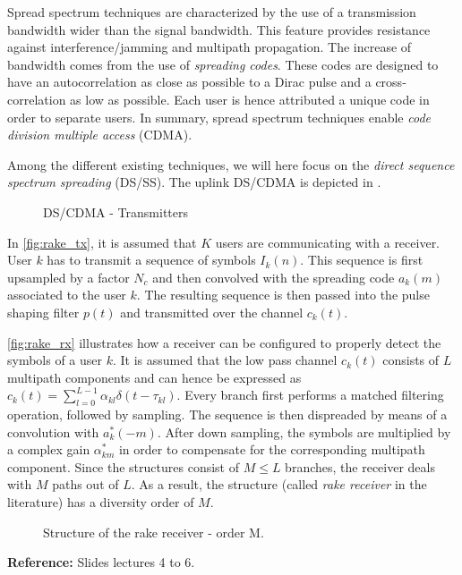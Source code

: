 \documentclass [a4paper, 11pt] {article}
\begin{document}
    \makesessiontitle

    \begin{reminder}


    Spread spectrum techniques are characterized by the use of a transmission bandwidth wider than the signal bandwidth. This feature provides resistance against interference/jamming and multipath propagation. The increase of bandwidth comes from the use of \textit{spreading codes}. These codes are designed to have an autocorrelation as close as possible to a Dirac pulse and a cross-correlation as low as possible. Each user is hence attributed a unique code in order to separate users. In summary, spread spectrum techniques enable \textit{code division multiple access} (CDMA).

    Among the different existing techniques, we will here focus on the \textit{direct sequence spectrum spreading} (DS/SS). The uplink DS/CDMA is depicted in .

    \begin{figure}[H]
        \centering
        
        \caption{DS/CDMA - Transmitters}
        \label{fig:rake_tx}
    \end{figure}


    In \autoref{fig:rake_tx}, it is assumed that $K$ users are communicating with a receiver. User $k$ has to transmit a sequence of symbols $I_k(n)$. This sequence is first upsampled by a factor $N_c$ and then convolved with the spreading code $a_k(m)$ associated to the user $k$. The resulting sequence is then passed into the pulse shaping filter $p(t)$ and transmitted over the channel $c_k(t)$.


    \autoref{fig:rake_rx} illustrates how a receiver can be configured to properly detect the symbols of a user $k$. It is assumed that the low pass channel $c_k(t)$ consists of $L$ multipath components and can hence be expressed as $c_k(t) = \sum_{l=0}^{L-1}\alpha_{kl}\delta(t-\tau_{kl})$. Every branch first performs a matched filtering operation, followed by sampling. The sequence is then dispreaded by means of a convolution with $a^*_k(-m)$. After down sampling, the symbols are multiplied by a complex gain $\alpha^*_{km}$ in order to compensate for the corresponding multipath component. Since the structures consist of $M \leq L$ branches, the receiver deals with $M$ paths out of $L$. As a result, the structure (called \textit{rake receiver} in the literature) has a diversity order of $M$.


    \begin{figure}[H]
        \centering
        
        \caption{Structure of the rake receiver - order M.}
        \label{fig:rake_rx}
    \end{figure}

    \vspace{0.2 cm}

    \textbf{Reference:} Slides lectures 4 to 6.

    \end{reminder}
\end{document}
